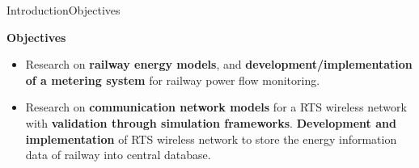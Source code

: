 	

		
		
		
		
	





\begin{frame}{Introduction}{Objectives}
\begin{block}{\textbf{Objectives}}
\begin{itemize}
	\setlength\itemsep{0em}
	
	\item	Research on \textbf{railway energy models}, and \textbf{development/implementation of a metering system} for railway power flow monitoring.
	
	\item Research on \textbf{communication network models} for a \ac{RTS} wireless network with \textbf{validation through simulation frameworks}.
	\textbf{Development and implementation} of \ac{RTS} wireless network to store the energy information data of railway into central database.
	
	
\end{itemize}
\end{block}
\end{frame}
